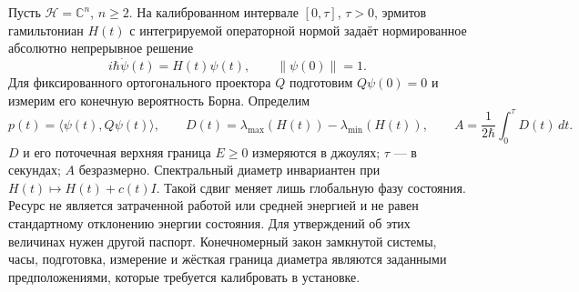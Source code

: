 \section{}\label{sec:record}
{Пусть $\mathcal H=\mathbb C^n$, $n\geq2$. На калиброванном интервале $[0,\tau]$, $\tau>0$, эрмитов гамильтониан $H(t)$ с интегрируемой операторной нормой задаёт нормированное абсолютно непрерывное решение}
\begin{equation}\label{eq:schrodinger}
 i\hbar\dot\psi(t)=H(t)\psi(t),\qquad \|\psi(0)\|=1.
\end{equation}
{Для фиксированного ортогонального проектора $Q$ подготовим $Q\psi(0)=0$ и измерим его конечную вероятность Борна. Определим}
\begin{equation}\label{eq:resource}
 p(t)=\langle\psi(t),Q\psi(t)\rangle,\qquad
 D(t)=\lambda_{\max}(H(t))-\lambda_{\min}(H(t)),\qquad
 A=\frac{1}{2\hbar}\int_0^\tau D(t)\,dt.
\end{equation}
{$D$ и его поточечная верхняя граница $E\geq0$ измеряются в джоулях; $\tau$ --- в секундах; $A$ безразмерно. Спектральный диаметр инвариантен при $H(t)\mapsto H(t)+c(t)I$. Такой сдвиг меняет лишь глобальную фазу состояния. Ресурс не является затраченной работой или средней энергией и не равен стандартному отклонению энергии состояния. Для утверждений об этих величинах нужен другой паспорт. Конечномерный закон замкнутой системы, часы, подготовка, измерение и жёсткая граница диаметра являются заданными предположениями, которые требуется калибровать в установке.}

